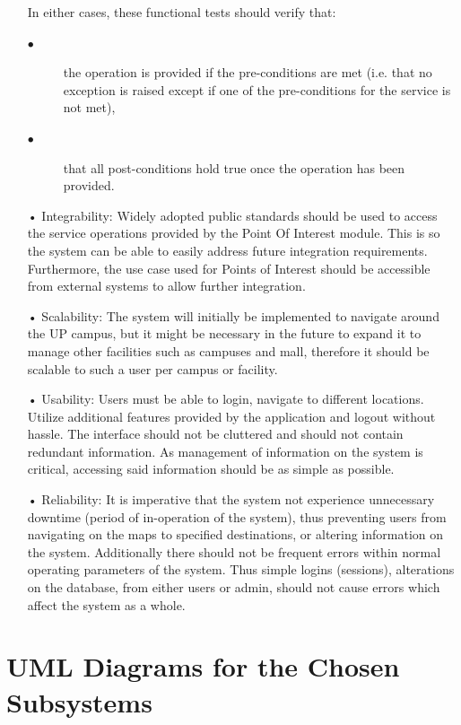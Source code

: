\documentclass[runningheads,a4paper]{article}
\begin{document}
\begin{enumerate}
In either cases, these functional tests should verify that:
\begin{description}
\item[$\bullet$] the operation is provided if the pre-conditions are met (i.e. that no exception is raised except if one of the pre-conditions for the service is not met),
\item[$\bullet$] that all post-conditions hold true once the operation has been provided.
\end{description} 

\item[•]Integrability: Widely adopted public standards should be used to access the service operations provided by the Point Of Interest module. This is so the system can be able to easily address future integration requirements. Furthermore, the use case used for Points of Interest should be accessible from external systems to allow further integration.

\item[•]Scalability: The system will initially be implemented to navigate around the UP campus, but it might be necessary in the future to expand it to manage other facilities such as campuses and mall, therefore it should be scalable to such a user per campus or facility.
\item[•]Usability: Users must be able to login, navigate to different locations. Utilize additional features provided by the application and logout without hassle. The interface should not be cluttered and should not contain redundant information. As management of information on the system is critical, accessing said information should be as simple as possible.
\item[•]Reliability: It is imperative that the system not experience unnecessary downtime (period of in-operation of the system), thus preventing users from navigating on the maps to specified destinations, or altering information on the system. Additionally there should not be frequent errors within normal operating parameters of the system. Thus simple logins (sessions), alterations on the database, from either users or admin, should not cause errors which affect the system as a whole.

\end{enumerate}

\section{UML Diagrams for the Chosen Subsystems}
\end{document}
